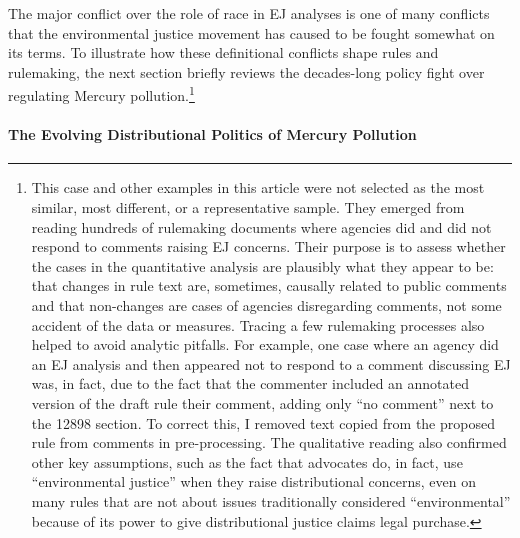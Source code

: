 \documentclass[
      12pt,
        ]{article}
\begin{document}
The major conflict over the role of race in EJ analyses is one of many conflicts that the environmental justice movement has caused to be fought somewhat on its terms. To illustrate how these definitional conflicts shape rules and rulemaking, the next section briefly reviews the decades-long policy fight over regulating Mercury pollution.\footnote{This case and other examples in this article were not selected as the most similar, most different, or a representative sample. They emerged from reading hundreds of rulemaking documents where agencies did and did not respond to comments raising EJ concerns. Their purpose is to assess whether the cases in the quantitative analysis are plausibly what they appear to be: that changes in rule text are, sometimes, causally related to public comments and that non-changes are cases of agencies disregarding comments, not some accident of the data or measures. Tracing a few rulemaking processes also helped to avoid analytic pitfalls. For example, one case where an agency did an EJ analysis and then appeared not to respond to a comment discussing EJ was, in fact, due to the fact that the commenter included an annotated version of the draft rule their comment, adding only ``no comment'' next to the 12898 section. To correct this, I removed text copied from the proposed rule from comments in pre-processing. The qualitative reading also confirmed other key assumptions, such as the fact that advocates do, in fact, use ``environmental justice'' when they raise distributional concerns, even on many rules that are not about issues traditionally considered ``environmental'' because of its power to give distributional justice claims legal purchase.}

\hypertarget{the-evolving-distributional-politics-of-mercury-pollution}{%
\paragraph{The Evolving Distributional Politics of Mercury Pollution}\label{the-evolving-distributional-politics-of-mercury-pollution}}
\end{document}
